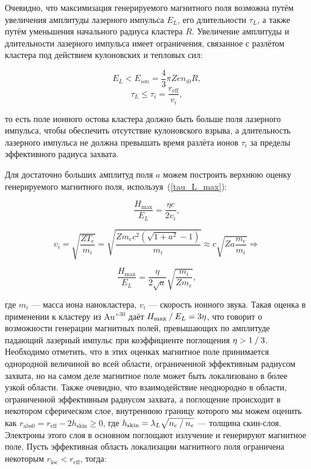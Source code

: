 Очевидно, что максимизация генерируемого магнитного поля возможна путём увеличения амплитуды лазерного импульса $E_L$, его длительности $\tau_L$, а также путём уменьшения начального радиуса кластера $R$. Увеличение амплитуды и длительности лазерного импульса имеет ограничения, связанное с разлётом кластера под действием кулоновских и тепловых сил:

    \begin{equation}
        E_L < E_{ion} = \frac{4}{3} \pi Z e n_{i0} R,
        \label{E_L_limit}
    \end{equation}
    \begin{equation}
        \tau_L \leq \tau_i = \frac{r_{\textrm{eff}}}{v_i},
        \label{tau_L_max}
    \end{equation}

\noindent то есть поле ионного остова кластера должно быть больше поля лазерного импульса, чтобы обеспечить отсутствие кулоновского взрыва, а длительность лазерного импульса не должна превышать время разлёта ионов $\tau_i$ за пределы эффективного радиуса захвата.

Для достаточно больших амплитуд поля $a$ можем построить верхнюю оценку генерируемого магнитного поля, используя~(\ref{tau_L_max}):

    \begin{equation}
        \frac{H_{\max}}{E_L} = \frac{\eta c}{2 v_i},
    \end{equation}

    \begin{equation}
        v_i = \sqrt{\frac{Z T_e}{m_i}} = \sqrt{\frac{Z m_e c^2 \left( \sqrt{1 + a^2} - 1 \right)}{m_i}} \approx c \sqrt{Z a \frac{m_e}{m_i}} \Rightarrow
    \end{equation}

    \begin{equation}
        \frac{H_{\max}}{E_L} = \frac{\eta}{2 \sqrt{a}} \sqrt{\frac{m_i}{Z m_e}},
        \label{H_max_plat}
    \end{equation}

\noindent где $m_i$ --- масса иона нанокластера, $v_i$ --- скорость ионного звука. Такая оценка в применении к кластеру из Au$^{+30}$ даёт ${H_{\max}}\:/\:{E_L} = 3 \eta$, что говорит о возможности генерации магнитных полей, превышающих по амплитуде падающий лазерный импульс при коэффициенте поглощения $\eta > {1}\:/\:{3}$. Необходимо отметить, что в этих оценках магнитное поле принимается однородной величиной во всей области, ограниченной эффективным радиусом захвата, но на самом деле магнитное поле может быть локализовано в более узкой области. Также очевидно, что взаимодействие неоднородно в области, ограниченной эффективным радиусом захвата, а поглощение происходит в некотором сферическом слое, внутреннюю границу которого мы можем оценить как $r_{\textrm{abs}0} = r_{\textrm{eff}} - 2 h_{\textrm{skin}} \geq 0$, где $h_{\textrm{skin}} = \lambda_L \sqrt{{n_c}\:/\:{n_{e}}}$ --- толщина скин-слоя. Электроны этого слоя в основном поглощают излучение и генерируют магнитное поле. Пусть эффективная область локализации магнитного поля ограничена некоторым $r_{\textrm{loc}} < r_{\textrm{eff}}$, тогда:

